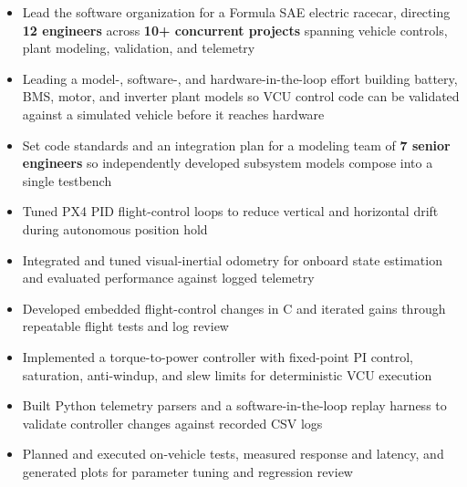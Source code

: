 \documentclass[10pt,letterpaper]{article}
\begin{document}
\bodyfont

\resumeheader
\educationsection




\orgline{\spartanracing}
\begin{itemize}
  \item Lead the software organization for a Formula SAE electric racecar, directing \textbf{12 engineers} across \textbf{10+ concurrent projects} spanning vehicle controls, plant modeling, validation, and telemetry
  \item Leading a model-, software-, and hardware-in-the-loop effort building battery, BMS, motor, and inverter plant models so VCU control code can be validated against a simulated vehicle before it reaches hardware
  \item Set code standards and an integration plan for a modeling team of \textbf{7 senior engineers} so independently developed subsystem models compose into a single testbench
\end{itemize}

\entryspace

\begin{itemize}
  \item Tuned PX4 PID flight-control loops to reduce vertical and horizontal drift during autonomous position hold
  \item Integrated and tuned visual-inertial odometry for onboard state estimation and evaluated performance against logged telemetry
  \item Developed embedded flight-control changes in C and iterated gains through repeatable flight tests and log review
\end{itemize}

\entryspace

\orgline{\spartanracing}
\begin{itemize}
  \item Implemented a torque-to-power controller with fixed-point PI control, saturation, anti-windup, and slew limits for deterministic VCU execution
  \item Built Python telemetry parsers and a software-in-the-loop replay harness to validate controller changes against recorded CSV logs
  \item Planned and executed on-vehicle tests, measured response and latency, and generated plots for parameter tuning and regression review
\end{itemize}
\end{document}
